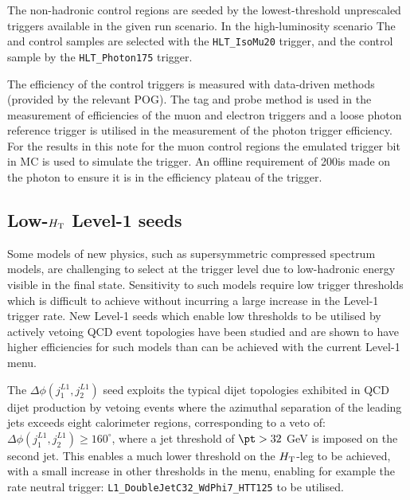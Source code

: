 The non-hadronic control regions are seeded by the lowest-threshold unprescaled 
triggers available in the given run scenario. In the high-luminosity scenario The 
\mj and \mmj control samples are selected with the \verb!HLT_IsoMu20! trigger,
and the \gj control sample by the \verb!HLT_Photon175! trigger. 

The efficiency of the control triggers is measured with data-driven methods
(provided by the relevant POG). The tag and probe method is used in the measurement of
efficiencies of the muon and electron triggers and a loose photon reference trigger 
is utilised in the measurement of the photon trigger efficiency. For the results in 
this note for the muon control regions the emulated trigger bit in MC is used to simulate 
the trigger. An offline \Pt requirement of 200\GeV is made on the photon
to ensure it is in the efficiency plateau of the trigger.








\subsection{Low-$\mbox{$H_\text{T}$}$ Level-1 seeds}

Some models of new physics, such as supersymmetric compressed spectrum models, are challenging to select at the trigger level due to low-hadronic energy visible in the final state. Sensitivity to such models require low trigger thresholds which is difficult to achieve without incurring a large increase in the Level-1 trigger rate. New Level-1 seeds which enable low thresholds to be utilised by actively vetoing QCD event topologies have been studied and are shown to have higher efficiencies for such models than can be achieved with the current Level-1 menu.

The $\Delta\phi(j_{1}^{L1},j_{2}^{L1})$ seed exploits the typical dijet topologies exhibited in QCD dijet production by vetoing events where the azimuthal separation of the leading jets exceeds eight calorimeter regions, corresponding to a veto of: $\Delta\phi(j_{1}^{L1},j_{2}^{L1}) \ge 160^{\circ}$, where a jet threshold of $\pt > 32$ GeV is imposed on the second jet. This enables a much lower threshold on the $\mbox{$H_\text{T}$}$-leg to be achieved, with a small increase in other thresholds in the menu, enabling for example the rate neutral trigger: \verb!L1_DoubleJetC32_WdPhi7_HTT125! to be utilised.


